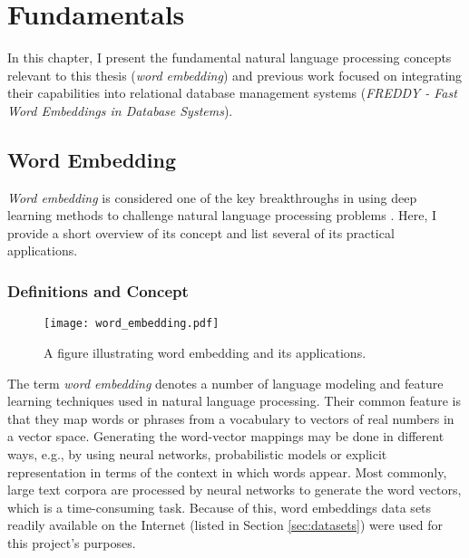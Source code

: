 
\chapter{Fundamentals}
\label{cha:fundamentals}
In this chapter, I present the fundamental natural language processing concepts relevant to this thesis (\textit{word embedding}) and previous work focused on integrating their capabilities into relational database management systems (\textit{FREDDY - Fast Word Embeddings in Database Systems}).

\section{Word Embedding}
\textit{Word embedding} is considered one of the key breakthroughs in using deep learning methods to challenge natural language processing problems \cite{we-mlm}. Here, I provide a short overview of its concept and list several of its practical applications.

\subsection{Definitions and Concept}
\begin{figure}[b]
	\centering\texttt{[image: word\_embedding.pdf]}
	\caption{A figure illustrating word embedding and its applications.}
	\label{fig:word_embedding}
\end{figure}
The term \textit{word embedding} denotes a number of language modeling and feature learning techniques used in natural language processing. Their common feature is that they map words or phrases from a vocabulary to vectors of real numbers in a vector space. Generating the word-vector mappings may be done in different ways, e.g., by using neural networks, probabilistic models or explicit representation in terms of the context in which words appear. Most commonly, large text corpora are processed by neural networks to generate the word vectors, which is a time-consuming task. Because of this, word embeddings data sets readily available on the Internet (listed in Section \ref{sec:datasets}) were used for this project's purposes. 

